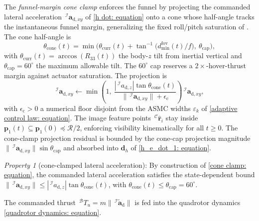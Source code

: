 The \emph{funnel-margin cone clamp} enforces the funnel by projecting the commanded lateral acceleration $\,^\mathcal{I}\boldsymbol{a}_{\text{d},xy}$ of \eqref{h dot: equation} onto a cone whose half-angle tracks the instantaneous funnel margin, generalizing the fixed roll/pitch saturation of \cite{xie2016}. The cone half-angle is
\begin{equation} \label{cone angle: equation}
    \theta_\text{cone}(t) = \min\!\Big(\theta_\text{curr}(t) + \tan^{-1}\!\big(d_\text{min}^\text{fov}(t)/f\big),\ \theta_\text{cap}\Big),
\end{equation}
with $\theta_\text{curr}(t)=\arccos(R_{33}(t))$ the body-$z$ tilt from inertial vertical and $\theta_\text{cap}=60^\circ$ the maximum allowable tilt. The $60^\circ$ cap reserves a $2\times$-hover-thrust margin against actuator saturation. The projection is
\begin{equation} \label{cone clamp: equation}
    \,^\mathcal{I}\boldsymbol{a}_{\text{d},xy}\leftarrow \min\!\left(1,\ \frac{|\,^\mathcal{I}a_{\text{d},z}|\tan\theta_\text{cone}(t)}{\|\,^\mathcal{I}\boldsymbol{a}_{\text{d},xy}\|+\epsilon_\text{c}}\right)\!\,^\mathcal{I}\boldsymbol{a}_{\text{d},xy},
\end{equation}
with $\epsilon_\text{c}>0$ a numerical floor disjoint from the ASMC widths $\varepsilon_k$ of \eqref{adaptive control law: equation}. The image feature points $\,^\mathcal{C}\hat{\boldsymbol{r}}_i$ stay inside $\boldsymbol{p}_1(t)\subseteq\boldsymbol{p}_1(0)\preceq\mathcal{R}/2$, enforcing visibility kinematically for all $t\ge 0$. The cone-clamp projection residual is bounded by the cone-cap projection magnitude $\|\,^\mathcal{I}\boldsymbol{a}_{\text{d},xy}\|\sin\theta_\text{cap}$ and absorbed into $\boldsymbol{d}_h$ of \eqref{h_e_dot_1: equation}.

\textit{Property 1} (cone-clamped lateral acceleration): By construction of \eqref{cone clamp: equation}, the commanded lateral acceleration satisfies the state-dependent bound $\|\,^\mathcal{I}\boldsymbol{a}_{\text{d},xy}\|\le|\,^\mathcal{I}a_{\text{d},z}|\tan\theta_\text{cone}(t)$, with $\theta_\text{cone}(t)\le\theta_\text{cap}=60^\circ$.

 The commanded thrust $\,^\mathcal{B}T_u=m\|\,^\mathcal{I}\tilde{\boldsymbol{a}}_\text{d}\|$ is fed into the quadrotor dynamics \eqref{quadrotor dynamics: equation}.

